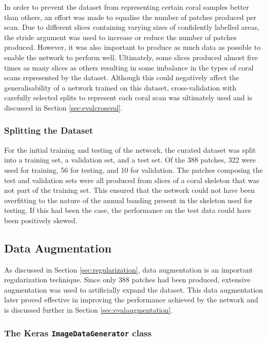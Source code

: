 In order to prevent the dataset from representing certain coral samples better than others, an effort was made to equalise the number of patches produced per scan. Due to different slices containing varying sizes of confidently labelled areas, the stride argument was used to increase or reduce the number of patches produced. However, it was also important to produce as much data as possible to enable the network to perform well. Ultimately, some slices produced almost five times as many slices as others resulting in some imbalance in the types of coral scans represented by the dataset. Although this could negatively affect the generalisability of a network trained on this dataset, cross-validation with carefully selected splits to represent each coral scan was ultimately used and is discussed in Section \ref{sec:evalcrossval}.

\subsubsection{Splitting the Dataset}

For the initial training and testing of the network, the curated dataset was split into a training set, a validation set, and a test set. Of the 388 patches, 322 were used for training, 56 for testing, and 10 for validation. The patches composing the test and validation sets were all produced from slices of a coral skeleton that was not part of the training set. This ensured that the network could not have been overfitting to the nature of the annual banding present in the skeleton used for testing. If this had been the case, the performance on the test data could have been positively skewed.

\subsection{Data Augmentation}

As discussed in Section \ref{sec:regularization}, data augmentation is an important regularization technique. Since only 388 patches had been produced, extensive augmentation was used to artificially expand the dataset. This data augmentation later proved effective in improving the performance achieved by the network and is discussed further in Section \ref{sec:evalaugmentation}.

\subsubsection{The Keras \texttt{ImageDataGenerator} class}

